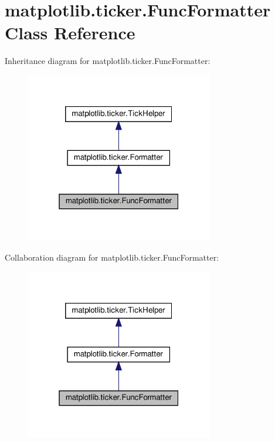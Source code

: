 \hypertarget{classmatplotlib_1_1ticker_1_1FuncFormatter}{}\section{matplotlib.\+ticker.\+Func\+Formatter Class Reference}
\label{classmatplotlib_1_1ticker_1_1FuncFormatter}


Inheritance diagram for matplotlib.\+ticker.\+Func\+Formatter\+:
\nopagebreak
\begin{figure}[H]
\begin{center}
\leavevmode
\includegraphics[width=232pt]{classmatplotlib_1_1ticker_1_1FuncFormatter__inherit__graph}
\end{center}
\end{figure}


Collaboration diagram for matplotlib.\+ticker.\+Func\+Formatter\+:
\nopagebreak
\begin{figure}[H]
\begin{center}
\leavevmode
\includegraphics[width=232pt]{classmatplotlib_1_1ticker_1_1FuncFormatter__coll__graph}
\end{center}
\end{figure}
